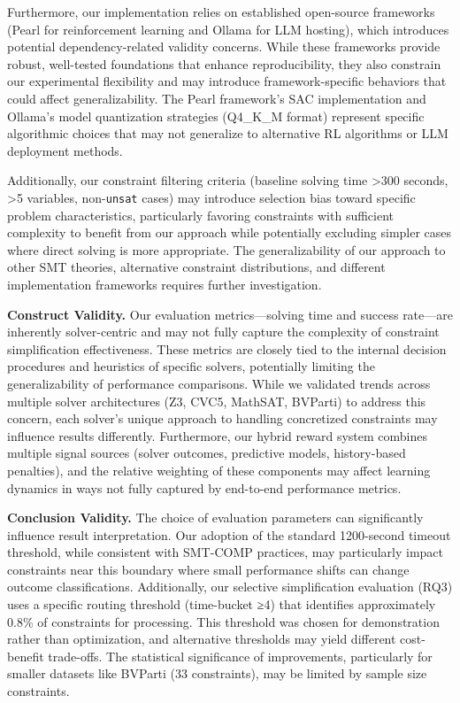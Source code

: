 Furthermore, our implementation relies on established open-source frameworks (Pearl for reinforcement learning and Ollama for LLM hosting), which introduces potential dependency-related validity concerns. While these frameworks provide robust, well-tested foundations that enhance reproducibility, they also constrain our experimental flexibility and may introduce framework-specific behaviors that could affect generalizability. The Pearl framework's SAC implementation and Ollama's model quantization strategies (Q4\_K\_M format) represent specific algorithmic choices that may not generalize to alternative RL algorithms or LLM deployment methods.

Additionally, our constraint filtering criteria (baseline solving time >300 seconds, >5 variables, non-\texttt{unsat} cases) may introduce selection bias toward specific problem characteristics, particularly favoring constraints with sufficient complexity to benefit from our approach while potentially excluding simpler cases where direct solving is more appropriate. The generalizability of our approach to other SMT theories, alternative constraint distributions, and different implementation frameworks requires further investigation.

\textbf{Construct Validity.} Our evaluation metrics—solving time and success rate—are inherently solver-centric and may not fully capture the complexity of constraint simplification effectiveness. These metrics are closely tied to the internal decision procedures and heuristics of specific solvers, potentially limiting the generalizability of performance comparisons. While we validated trends across multiple solver architectures (Z3, CVC5, MathSAT, BVParti) to address this concern, each solver's unique approach to handling concretized constraints may influence results differently. Furthermore, our hybrid reward system combines multiple signal sources (solver outcomes, predictive models, history-based penalties), and the relative weighting of these components may affect learning dynamics in ways not fully captured by end-to-end performance metrics.

\textbf{Conclusion Validity.} The choice of evaluation parameters can significantly influence result interpretation. Our adoption of the standard 1200-second timeout threshold, while consistent with SMT-COMP practices, may particularly impact constraints near this boundary where small performance shifts can change outcome classifications. Additionally, our selective simplification evaluation (RQ3) uses a specific routing threshold (time-bucket ≥4) that identifies approximately 0.8\% of constraints for \tool processing. This threshold was chosen for demonstration rather than optimization, and alternative thresholds may yield different cost-benefit trade-offs. The statistical significance of improvements, particularly for smaller datasets like BVParti (33 constraints), may be limited by sample size constraints.

